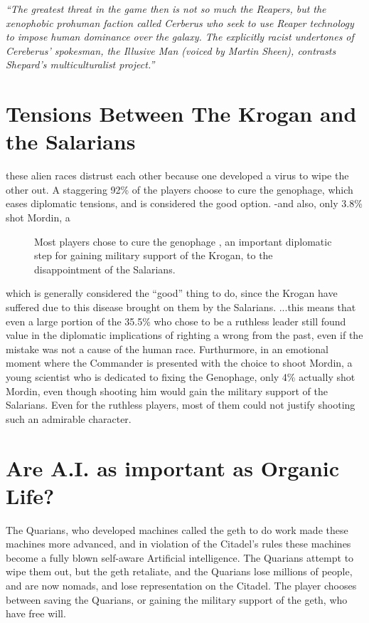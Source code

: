 \documentclass[journal]{IEEEtran}
\begin{document}
\textit{``The greatest threat in the game then is not so much the Reapers, but the xenophobic prohuman faction called Cerberus who seek to use Reaper technology to impose human dominance over the galaxy. The explicitly racist undertones of Cereberus’ spokesman, the Illusive Man (voiced by Martin Sheen), contrasts Shepard’s multiculturalist project.''\cite{chrisb}
}


\section{Tensions Between The Krogan and the Salarians}
these alien races distrust each other because one developed a virus to wipe the
other out. A staggering 92\% of the players choose to cure the genophage, which
eases diplomatic tensions, and is considered the good option. -and also,
only 3.8\% shot Mordin, a
\begin{figure}
 \begin{adjustbox}{width=.4\textwidth}
 \end{adjustbox}
 \caption{Most players chose to cure the genophage \cite{ea}, an important diplomatic step for gaining military support of the Krogan, to the disappointment of the Salarians.}
\end{figure}
which is generally considered the ``good'' thing to do, since the Krogan have suffered due to this disease brought on them by the Salarians.
...this means that even a large portion of the 35.5\% who chose
to be a ruthless leader still found value in the diplomatic implications
of righting a wrong from the past, even if the mistake was not a cause
of the human race. Furthurmore, in an emotional moment where the Commander is
presented with the choice to shoot Mordin, a young scientist who is dedicated
to fixing the Genophage, only 4\% actually shot Mordin, even though shooting him would gain the military support of the Salarians. Even for the ruthless players, most of them could not justify shooting such an admirable character.
\section{Are A.I. as important as Organic Life?}
The Quarians, who developed machines called the geth to do work made these
machines more advanced, and in violation of the Citadel's rules these machines
become a fully blown self-aware Artificial intelligence. The Quarians attempt to wipe them out, but the geth retaliate, and the Quarians lose millions of people, and are now nomads, and lose representation on the Citadel.
The player chooses between saving the Quarians, or gaining the military support of the geth, who have free will.
\end{document}
